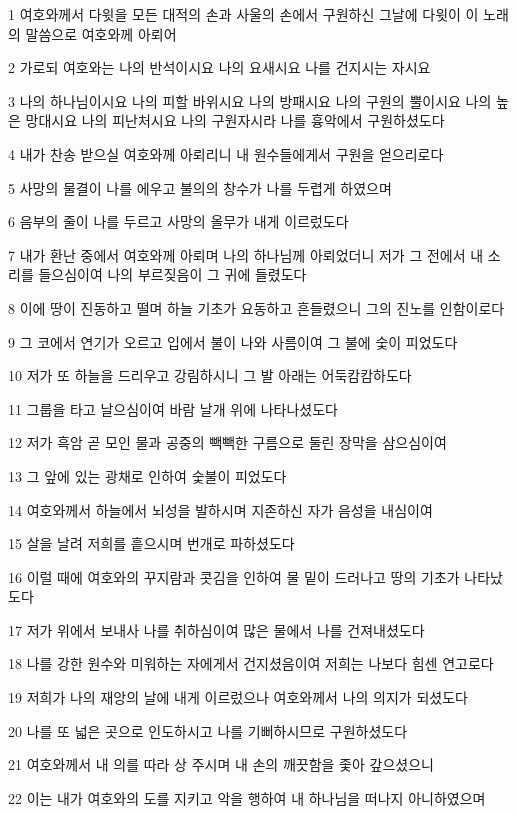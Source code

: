 \par 1 여호와께서 다윗을 모든 대적의 손과 사울의 손에서 구원하신 그날에 다윗이 이 노래의 말씀으로 여호와께 아뢰어
\par 2 가로되 여호와는 나의 반석이시요 나의 요새시요 나를 건지시는 자시요
\par 3 나의 하나님이시요 나의 피할 바위시요 나의 방패시요 나의 구원의 뿔이시요 나의 높은 망대시요 나의 피난처시요 나의 구원자시라 나를 흉악에서 구원하셨도다
\par 4 내가 찬송 받으실 여호와께 아뢰리니 내 원수들에게서 구원을 얻으리로다
\par 5 사망의 물결이 나를 에우고 불의의 창수가 나를 두렵게 하였으며
\par 6 음부의 줄이 나를 두르고 사망의 올무가 내게 이르렀도다
\par 7 내가 환난 중에서 여호와께 아뢰며 나의 하나님께 아뢰었더니 저가 그 전에서 내 소리를 들으심이여 나의 부르짖음이 그 귀에 들렸도다
\par 8 이에 땅이 진동하고 떨며 하늘 기초가 요동하고 흔들렸으니 그의 진노를 인함이로다
\par 9 그 코에서 연기가 오르고 입에서 불이 나와 사름이여 그 불에 숯이 피었도다
\par 10 저가 또 하늘을 드리우고 강림하시니 그 발 아래는 어둑캄캄하도다
\par 11 그룹을 타고 날으심이여 바람 날개 위에 나타나셨도다
\par 12 저가 흑암 곧 모인 물과 공중의 빽빽한 구름으로 둘린 장막을 삼으심이여
\par 13 그 앞에 있는 광채로 인하여 숯불이 피었도다
\par 14 여호와께서 하늘에서 뇌성을 발하시며 지존하신 자가 음성을 내심이여
\par 15 살을 날려 저희를 흩으시며 번개로 파하셨도다
\par 16 이럴 때에 여호와의 꾸지람과 콧김을 인하여 물 밑이 드러나고 땅의 기초가 나타났도다
\par 17 저가 위에서 보내사 나를 취하심이여 많은 물에서 나를 건져내셨도다
\par 18 나를 강한 원수와 미워하는 자에게서 건지셨음이여 저희는 나보다 힘센 연고로다
\par 19 저희가 나의 재앙의 날에 내게 이르렀으나 여호와께서 나의 의지가 되셨도다
\par 20 나를 또 넓은 곳으로 인도하시고 나를 기뻐하시므로 구원하셨도다
\par 21 여호와께서 내 의를 따라 상 주시며 내 손의 깨끗함을 좇아 갚으셨으니
\par 22 이는 내가 여호와의 도를 지키고 악을 행하여 내 하나님을 떠나지 아니하였으며
